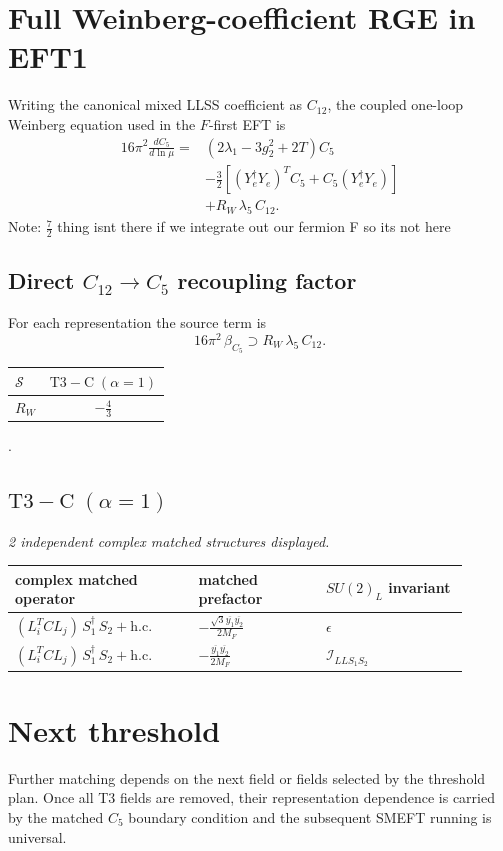\documentclass[9pt]{article}
\begin{document}
\section*{Full Weinberg-coefficient RGE in EFT1}
Writing the canonical mixed LLSS coefficient as $C_{12}$, the coupled one-loop Weinberg equation used in the $F$-first EFT is
\begin{align}
16\pi^2\frac{dC_5}{d\ln\mu}={}&(2\lambda_1-3g_2^2+2T)C_5\\
&-\frac32\left[(Y_e^\dagger Y_e)^T C_5+C_5(Y_e^\dagger Y_e)\right]\\
&+R_W\,\lambda_5\,C_{12}.
\end{align}
Note: $\frac{7}{2}$ thing isnt there if we integrate out our fermion F so its not here \subsection*{Direct $C_{12}\to C_5$ recoupling factor}
For each representation the source term is
\[16\pi^2\,\beta_{C_5}\supset R_W\,\lambda_5\,C_{12}.\]
\begin{longtable}{@{}lc@{}}
\toprule
$\mathcal{S}$ & $ \mathrm{T3-C}\;(\alpha=1) $ \\
\midrule
$R_W$ & $ - \frac{4}{3} $ \\
\bottomrule
\end{longtable}
.
\subsection*{$ \mathrm{T3-C}\;(\alpha=1) $}
\textit{2 independent complex matched structures displayed. }
\begin{longtable}{@{}p{0.36\linewidth}p{0.25\linewidth}p{0.29\linewidth}@{}}
\toprule
complex matched operator & matched prefactor & $SU(2)_L$ invariant \\
\midrule
$ (L_i^T C L_j)\,S_1^\dagger\,S_2+\mathrm{h.c.} $ & $ - \frac{\sqrt{3} \overline{y_{1}} \overline{y_{2}}}{2 M_F} $ & $ \epsilon $ \\
$ (L_i^T C L_j)\,S_1^\dagger\,S_2+\mathrm{h.c.} $ & $ - \frac{\overline{y_{1}} \overline{y_{2}}}{2 M_F} $ & $ \mathcal{I}_{LLS_1S_2} $ \\
\bottomrule
\end{longtable}
\section*{Next threshold}
Further matching depends on the next field or fields selected by the threshold plan.  Once all T3 fields are removed, their representation dependence is carried by the matched $C_5$ boundary condition and the subsequent SMEFT running is universal.
\end{document}
